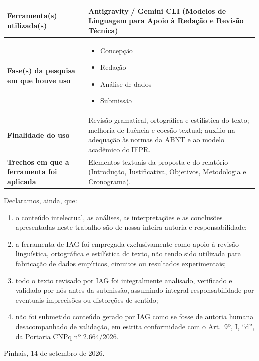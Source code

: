 \bigskip
\begin{center}
\begin{tabular}{|p{4.2cm}|p{9.8cm}|}
\hline
\textbf{Ferramenta(s) utilizada(s)} & Antigravity / Gemini CLI (Modelos de Linguagem para Apoio à Redação e Revisão Técnica) \\
\hline
\textbf{Fase(s) da pesquisa em que houve uso} &
\begin{itemize}[leftmargin=*, nosep]
  \item[$\square$] Concepção
  \item[$\blacksquare$] Redação
  \item[$\square$] Análise de dados
  \item[$\square$] Submissão
\end{itemize} \\
\hline
\textbf{Finalidade do uso} & Revisão gramatical, ortográfica e estilística do texto; melhoria de fluência e coesão textual; auxílio na adequação às normas da ABNT e ao modelo acadêmico do IFPR. \\
\hline
\textbf{Trechos em que a ferramenta foi aplicada} & Elementos textuais da proposta e do relatório (Introdução, Justificativa, Objetivos, Metodologia e Cronograma). \\
\hline
\end{tabular}
\end{center}

\bigskip
\noindent
Declaramos, ainda, que:
\begin{enumerate}[label=\alph*)]
  \item o conteúdo intelectual, as análises, as interpretações e as conclusões apresentadas neste trabalho são de nossa inteira autoria e responsabilidade;
  \item a ferramenta de IAG foi empregada exclusivamente como apoio à revisão linguística, ortográfica e estilística do texto, não tendo sido utilizada para fabricação de dados empíricos, circuitos ou resultados experimentais;
  \item todo o texto revisado por IAG foi integralmente analisado, verificado e validado por nós antes da submissão, assumindo integral responsabilidade por eventuais imprecisões ou distorções de sentido;
  \item não foi submetido conteúdo gerado por IAG como se fosse de autoria humana desacompanhado de validação, em estrita conformidade com o Art.~9º, I, ``d'', da Portaria CNPq nº 2.664/2026.
\end{enumerate}

\bigskip
\noindent
Pinhais, 14 de setembro de 2026.

